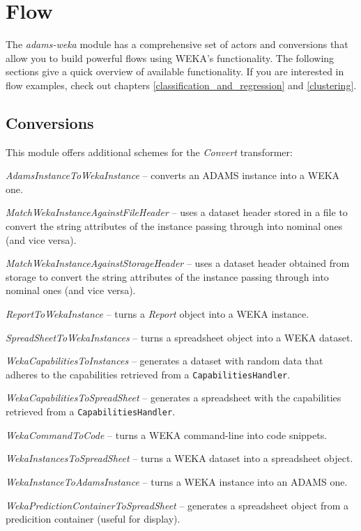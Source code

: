 %

\chapter{Flow}
The \textit{adams-weka} module has a comprehensive set of actors and conversions
that allow you to build powerful flows using WEKA's functionality. The following
sections give a quick overview of available functionality. If you are interested
in flow examples, check out chapters \ref{classification_and_regression} and
\ref{clustering}.

\section{Conversions}
This module offers additional schemes for the \textit{Convert} transformer:
\begin{tight_itemize}
	\item \textit{AdamsInstanceToWekaInstance} -- converts an ADAMS instance
	into a WEKA one.
	\item \textit{MatchWekaInstanceAgainstFileHeader} -- uses a dataset header
	stored in a file to convert the string attributes of the instance passing 
	through into nominal ones (and vice versa).
	\item \textit{MatchWekaInstanceAgainstStorageHeader} -- uses a dataset
	header obtained from storage to convert the string attributes of the 
	instance passing through into nominal ones (and vice versa).
	\item \textit{ReportToWekaInstance} -- turns a \textit{Report} object
	into a WEKA instance.
	\item \textit{SpreadSheetToWekaInstances} -- turns a spreadsheet object
	into a WEKA dataset.
	\item \textit{WekaCapabilitiesToInstances} -- generates a dataset with
	random data that adheres to the capabilities retrieved from a
	\texttt{CapabilitiesHandler}.
	\item \textit{WekaCapabilitiesToSpreadSheet} -- generates a spreadsheet
	with the  capabilities retrieved from a \texttt{CapabilitiesHandler}.
	\item \textit{WekaCommandToCode} -- turns a WEKA command-line into
	code snippets.
	\item \textit{WekaInstancesToSpreadSheet} -- turns a WEKA dataset into
	a spreadsheet object.
	\item \textit{WekaInstanceToAdamsInstance} -- turns a WEKA instance into
	an ADAMS one.
	\item \textit{WekaPredictionContainerToSpreadSheet} -- generates a 
	spreadsheet object from a predicition container (useful for display).
\end{tight_itemize}

